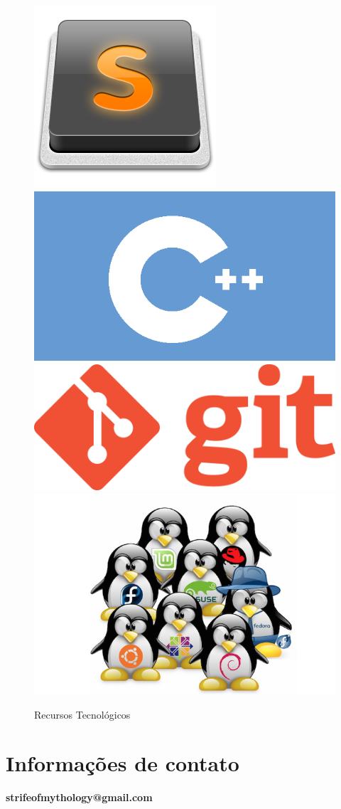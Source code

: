 \documentclass[11pt]{article} %
\begin{document}
\begin{figure}[!htp]
\begin{center}
  \includegraphics[scale=0.3]{res/Sublime_Text_Logo.png} \quad
  \includegraphics[scale=0.2]{res/cpp.png} \quad
  \includegraphics[scale=0.13]{res/git.png} \quad
  \includegraphics[scale=0.5]{res/linux.png} \quad
\caption{Recursos Tecnológicos} \label{gdimotes}
\end{center}
\end{figure}

\section*{Informações de contato}
{\Huge \textbf{strifeofmythology@gmail.com}}
\end{document}
